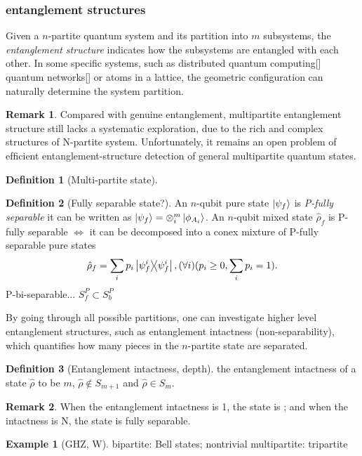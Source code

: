 \documentclass[
aps,
pra,
linenumbers,
floatfix,
]{revtex4-2}
\theoremstyle{plain}
\theoremstyle{definition}
\newtheorem{definition}{Definition}
\newtheorem{example}{Example}
\newtheorem{remark}{Remark}
\newcommand{\dm}{\hat{\rho}}
\begin{document}
\subsubsection{entanglement structures}
Given a $n$-partite quantum system and its partition into $m$ subsystems, the \emph{entanglement structure} indicates how the subsystems are entangled with each other.
In some specific systems, such as distributed quantum computing[] quantum networks[] or atoms in a lattice, the geometric configuration can naturally determine the system partition.
\begin{remark}
	Compared with genuine entanglement, multipartite entanglement structure still lacks a systematic exploration, due to the rich and complex structures of N-partite system.
	Unfortunately, it remains an open problem of efﬁcient entanglement-structure detection of general multipartite quantum states.
\end{remark}
\begin{definition}[Multi-partite state]
\end{definition}
\begin{definition}[Fully separable state?]\label{def:fully_separable}
	An $n$-qubit pure state $\ket{\psi_f}$ is \emph{P-fully separable} \iff it can be written as 
	$\ket{\psi_f}=\otimes_i^m \ket{\phi_{A_i}}$.
	An $n$-qubit mixed state $\dm_f$ is P-fully separable $\iff$ it can be decomposed into a conex mixture of P-fully separable pure states 
	\begin{equation}
		\dm_f = \sum_i p_i \op{\psi_f^i}, (\forall i) ( p_i\ge 0, \sum_i p_i = 1) .
	\end{equation}
	P-bi-separable... $S_f^P \subset S_b^P$
\end{definition}
By going through all possible partitions, one can investigate higher level entanglement structures, such as entanglement intactness (non-separability), which quantifies how many pieces in the $n$-partite state are separated.
\begin{definition}[Entanglement intactness, depth]
	the entanglement intactness of a state $\dm$ to be $m$, \iff $\dm\notin S_{m+1}$ and $\dm\in S_m$.
\end{definition}
\begin{remark}
	When the entanglement intactness is 1, the state is ; and when the intactness is N, the state is fully separable.
\end{remark}
\begin{example}[GHZ, W]
	bipartite: Bell states;
	nontrivial multipartite: tripartite
\end{example}
\end{document}
